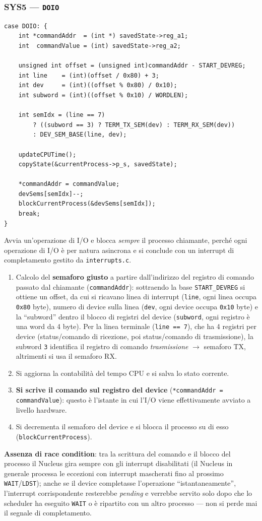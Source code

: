 \documentclass[11pt,a4paper]{article}
\newcommand{\code}[1]{\texttt{#1}}
\begin{document}
\subsubsection{SYS5 --- \code{DOIO}}
\begin{lstlisting}
case DOIO: {
    int *commandAddr  = (int *) savedState->reg_a1;
    int  commandValue = (int) savedState->reg_a2;

    unsigned int offset = (unsigned int)commandAddr - START_DEVREG;
    int line    = (int)(offset / 0x80) + 3;
    int dev     = (int)((offset % 0x80) / 0x10);
    int subword = (int)((offset % 0x10) / WORDLEN);

    int semIdx = (line == 7)
        ? ((subword == 3) ? TERM_TX_SEM(dev) : TERM_RX_SEM(dev))
        : DEV_SEM_BASE(line, dev);

    updateCPUTime();
    copyState(&currentProcess->p_s, savedState);

    *commandAddr = commandValue;
    devSems[semIdx]--;
    blockCurrentProcess(&devSems[semIdx]);
    break;
}
\end{lstlisting}
Avvia un'operazione di I/O e blocca \emph{sempre} il processo chiamante,
perché ogni operazione di I/O è per natura asincrona e si conclude con un
interrupt di completamento gestito da \code{interrupts.c}.
\begin{enumerate}
\item Calcolo del \textbf{semaforo giusto} a partire dall'indirizzo del
  registro di comando passato dal chiamante (\code{commandAddr}):
  sottraendo la base \code{START\_DEVREG} si ottiene un offset, da cui si
  ricavano linea di interrupt (\code{line}, ogni linea occupa \code{0x80}
  byte), numero di device sulla linea (\code{dev}, ogni device occupa
  \code{0x10} byte) e la ``subword'' dentro il blocco di registri del
  device (\code{subword}, ogni registro è una word da 4 byte). Per la linea
  terminale (\code{line == 7}), che ha 4 registri per device (status/comando
  di ricezione, poi status/comando di trasmissione), la subword \code{3}
  identifica il registro di comando \emph{trasmissione} $\to$ semaforo TX,
  altrimenti si usa il semaforo RX.
\item Si aggiorna la contabilità del tempo CPU e si salva lo stato corrente.
\item \textbf{Si scrive il comando sul registro del device}
  (\code{*commandAddr = commandValue}): questo è l'istante in cui l'I/O
  viene effettivamente avviato a livello hardware.
\item Si decrementa il semaforo del device e si blocca il processo su di
  esso (\code{blockCurrentProcess}).
\end{enumerate}
\textbf{Assenza di race condition}: tra la scrittura del comando e il blocco
del processo il Nucleus gira sempre con gli interrupt disabilitati (il
Nucleus in generale processa le eccezioni con interrupt mascherati fino al
prossimo \code{WAIT}/\code{LDST}); anche se il device completasse
l'operazione ``istantaneamente'', l'interrupt corrispondente resterebbe
\emph{pending} e verrebbe servito solo dopo che lo scheduler ha eseguito
\code{WAIT} o è ripartito con un altro processo --- non si perde mai il
segnale di completamento.
\end{document}
